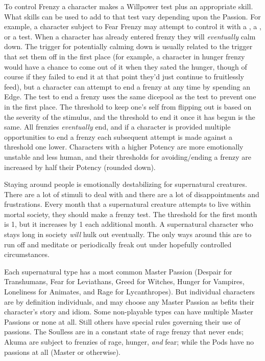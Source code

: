 To control Frenzy a character makes a Willpower test plus an appropriate skill. What skills can be used to add to that test vary depending upon the Passion. For example, a character subject to Fear Frenzy may attempt to control it with a , a , or a  test. When a character has already entered frenzy they will \textit{eventually} calm down. The trigger for potentially calming down is usually related to the trigger that set them off in the first place (for example, a character in hunger frenzy would have a chance to come out of it when they sated the hunger, though of course if they failed to end it at that point they'd just continue to fruitlessly feed), but a character can attempt to end a frenzy at any time by spending an Edge. The test to end a frenzy uses the same dicepool as the test to prevent one in the first place. The threshold to keep one's self from flipping out is based on the severity of the stimulus, and the threshold to end it once it has begun is the same. All frenzies \textit{eventually} end, and if a character is provided multiple opportunities to end a frenzy each subsequent attempt is made against a threshold one lower. Characters with a higher Potency are more emotionally unstable and less human, and their thresholds for avoiding/ending a frenzy are increased by half their Potency (rounded down).

Staying around people is emotionally destabilizing for supernatural creatures. There are a lot of stimuli to deal with and there are a lot of disappointments and frustrations. Every month that a supernatural creature attempts to live within mortal society, they should make a frenzy test. The threshold for the first month is 1, but it increases by 1 each additional month. A supernatural character who stays long in society \textit{will} hulk out eventually. The only ways around this are to run off and meditate or periodically freak out under hopefully controlled circumstances.

Each supernatural type has a most common Master Passion (Despair for Transhumans, Fear for Leviathans, Greed for Witches, Hunger for Vampires, Loneliness for Animates, and Rage for Lycanthropes). But individual characters are by definition individuals, and may choose any Master Passion as befits their character's story and idiom. Some non-playable types can have multiple Master Passions or none at all. Still others have special rules governing their use of passions. The Soulless are in a constant state of rage frenzy that never ends; Akuma are subject to frenzies of rage, hunger, \textit{and} fear; while the Pods have no passions at all (Master or otherwise).

